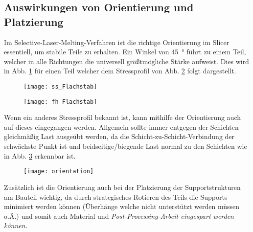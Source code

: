 \documentclass[../main.tex]{subfiles}
\begin{document}
\subsection{Auswirkungen von Orientierung und Platzierung}
Im Selective-Laser-Melting-Verfahren ist die richtige Orientierung im Slicer essentiell, um stabile Teile zu erhalten.
Ein Winkel von \qty{45}{\degree} führt zu einem Teil, welcher in alle Richtungen die universell größtmögliche Stärke aufweist. Dies wird in Abb. \ref{img:ss_1} für einen Teil welcher dem Stressprofil von Abb. \ref{img:fh_1} folgt dargestellt. 
\begin{figure}[h]
	\centering
	\texttt{[image: ss\_Flachstab]}
	\label{img:ss_1}
\end{figure}
\begin{figure}[h]
	\centering
	\texttt{[image: fh\_Flachstab]}
	\label{img:fh_1}
\end{figure}

Wenn ein anderes Stressprofil bekannt ist, kann mithilfe der Orientierung auch auf dieses eingegangen werden. Allgemein sollte immer entgegen der Schichten gleichmäßig Last ausgeübt werden, da die Schicht-zu-Schicht-Verbindung der schwächste Punkt ist und beidseitige/biegende Last normal zu den Schichten wie in Abb. \ref{img:orient_1} erkennbar ist.

\begin{figure}[h]
	\centering
	\texttt{[image: orientation]}
	\label{img:orient_1}
\end{figure}
Zusätzlich ist die Orientierung auch bei der Platzierung der Supportstrukturen am Bauteil wichtig, da durch strategisches Rotieren des Teils die Supports minimiert werden können (Überhänge welche nicht unterstützt werden müssen o.Ä.) und somit auch Material und \it{Post-Processing}-Arbeit eingespart werden können. 
\end{document}
